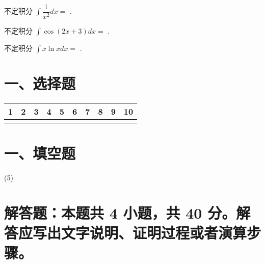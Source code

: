\documentclass{exam-zh}
\begin{document}
\begin{question}
  不定积分 $\int \dfrac{1}{x^2} dx =$ \fillin[$-\dfrac{1}{x} + C$].
\end{question}

\begin{question}
  不定积分 $\int \cos(2x + 3) dx =$ .
\end{question}

\begin{question}
  不定积分 $\int x \ln x dx =$ .
\end{question}

\section*{一、选择题}
\begin{table}[h]
\centering
\begin{tabular}{|C|C|C|C|C|C|C|C|C|C|}
   & 2 & 3 & 4 & 5 & 6 & 7 & 8 & 9 & 10 \\
  \hline
    &   &   &   &   &   &   &   &   &    \\
  \hline
\end{tabular}
\end{table}

\section*{一、填空题}
\begin{tasks}[label=\arabic*.](5)
  \task \underline{\hspace{2cm}}
  \task \underline{\hspace{2cm}}
  \task \underline{\hspace{2cm}}
  \task \underline{\hspace{2cm}}
  \task \underline{\hspace{2cm}}
  \task \underline{\hspace{2cm}}
  \task \underline{\hspace{2cm}}
  \task \underline{\hspace{2cm}}
  \task \underline{\hspace{2cm}}
  \task \underline{\hspace{2cm}}
\end{tasks}  

\clearpage

\section{解答题：本题共 4 小题，共 40 分。解答应写出文字说明、证明过程或者演算步骤。}
\end{document}
